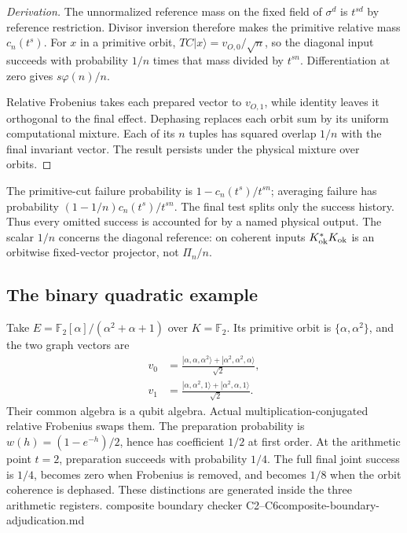 \begin{proof}[Derivation]
The unnormalized reference mass on the fixed field of $\sigma^d$ is
$t^{sd}$ by reference restriction. Divisor inversion therefore makes
the primitive relative mass $c_n(t^s)$. For $x$ in a primitive orbit,
$TC|x\rangle=v_{O,0}/\sqrt n$, so the diagonal input succeeds with
probability $1/n$ times that mass divided by $t^{sn}$.
Differentiation at zero gives $s\varphi(n)/n$.

Relative Frobenius takes each prepared vector to $v_{O,1}$, while identity
leaves it orthogonal to the final effect. Dephasing replaces each orbit
sum by its uniform computational mixture. Each of its $n$ tuples has
squared overlap $1/n$ with the final invariant vector. The result persists
under the physical mixture over orbits.
\end{proof}

The primitive-cut failure probability is $1-c_n(t^s)/t^{sn}$; averaging
failure has probability $(1-1/n)c_n(t^s)/t^{sn}$. The final test splits
only the success history. Thus every omitted success is accounted for by
a named physical output. The scalar $1/n$ concerns the diagonal reference:
on coherent inputs $K_{\rm ok}^*K_{\rm ok}$ is an orbitwise fixed-vector
projector, not $\Pi_n/n$.

\subsection{The binary quadratic example}

Take $E=\mathbb F_2[\alpha]/(\alpha^2+\alpha+1)$ over $K=\mathbb F_2$.
Its primitive orbit is $\{\alpha,\alpha^2\}$, and the two graph vectors are
\begin{align*}
 v_0&=\frac{|\alpha,\alpha,\alpha^2\rangle+
                  |\alpha^2,\alpha^2,\alpha\rangle}{\sqrt2},\\
 v_1&=\frac{|\alpha,\alpha^2,1\rangle+
                  |\alpha^2,\alpha,1\rangle}{\sqrt2}.
\end{align*}
Their common algebra is a qubit algebra. Actual multiplication-conjugated
relative Frobenius swaps them. The preparation probability is
$w(h)=(1-e^{-h})/2$, hence has coefficient $1/2$ at first order.
At the arithmetic point $t=2$, preparation succeeds with probability
$1/4$. The full final joint success is $1/4$, becomes zero when Frobenius
is removed, and becomes $1/8$ when the orbit coherence is dephased.
These distinctions are generated inside the three arithmetic registers.
{composite boundary checker C2--C6}{composite-boundary-adjudication.md}


